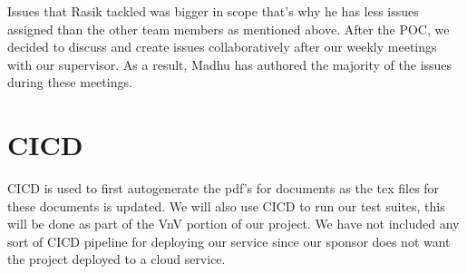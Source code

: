 \documentclass{article}
\begin{document}
Issues that Rasik tackled was bigger in scope that's why he has less issues assigned than the other team members as mentioned above. After the POC, we decided to discuss and create issues collaboratively after our weekly meetings with our supervisor. As a result, Madhu has authored the majority of the issues during these meetings.

\section{CICD}
CICD is used to first autogenerate the pdf's for documents as the tex files for these documents is updated. We will also use CICD to run our test suites, this will be done as part of the VnV portion of our project. We have not included any sort of CICD pipeline for deploying our service since our sponsor does not want the project deployed to a cloud service. 
\end{document}
